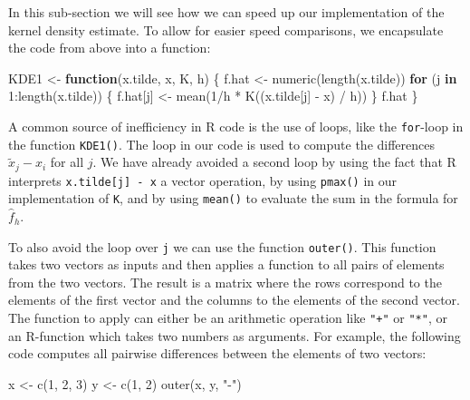 \documentclass[
  a4paper,
]{article}
\newenvironment{Shaded}{\begin{snugshade}}{\end{snugshade}}
\newcommand{\ControlFlowTok}[1]{\textcolor[rgb]{0.13,0.29,0.53}{\textbf{#1}}}
\newcommand{\DecValTok}[1]{\textcolor[rgb]{0.00,0.00,0.81}{#1}}
\newcommand{\FunctionTok}[1]{\textcolor[rgb]{0.00,0.00,0.00}{#1}}
\newcommand{\NormalTok}[1]{#1}
\newcommand{\OtherTok}[1]{\textcolor[rgb]{0.56,0.35,0.01}{#1}}
\newcommand{\SpecialCharTok}[1]{\textcolor[rgb]{0.00,0.00,0.00}{#1}}
\newcommand{\StringTok}[1]{\textcolor[rgb]{0.31,0.60,0.02}{#1}}
\theoremstyle{definition}
\theoremstyle{definition}
\theoremstyle{definition}
\theoremstyle{definition}
\theoremstyle{remark}
\begin{document}
In this sub-section we will see how we can speed up our implementation
of the kernel density estimate.
To allow for easier speed comparisons, we encapsulate the code from
above into a function:

\begin{Shaded}
\begin{Highlighting}[]
\NormalTok{KDE1 }\OtherTok{\textless{}{-}} \ControlFlowTok{function}\NormalTok{(x.tilde, x, K, h) \{}
\NormalTok{  f.hat }\OtherTok{\textless{}{-}} \FunctionTok{numeric}\NormalTok{(}\FunctionTok{length}\NormalTok{(x.tilde))}
  \ControlFlowTok{for}\NormalTok{ (j }\ControlFlowTok{in} \DecValTok{1}\SpecialCharTok{:}\FunctionTok{length}\NormalTok{(x.tilde)) \{}
\NormalTok{    f.hat[j] }\OtherTok{\textless{}{-}} \FunctionTok{mean}\NormalTok{(}\DecValTok{1}\SpecialCharTok{/}\NormalTok{h }\SpecialCharTok{*} \FunctionTok{K}\NormalTok{((x.tilde[j] }\SpecialCharTok{{-}}\NormalTok{ x) }\SpecialCharTok{/}\NormalTok{ h))}
\NormalTok{  \}}
\NormalTok{  f.hat}
\NormalTok{\}}
\end{Highlighting}
\end{Shaded}

A common source of inefficiency in R code is the use of loops, like
the \texttt{for}-loop in the function \texttt{KDE1()}. The loop in our code
is used to compute the differences \(\tilde x_j - x_i\) for all \(j\).
We have already avoided a second loop by using the fact that
R interprets \texttt{x.tilde{[}j{]}\ -\ x} a vector operation, by using \texttt{pmax()}
in our implementation of \texttt{K}, and by using \texttt{mean()} to evaluate
the sum in the formula for~\(\hat f_h\).

To also avoid the loop over \texttt{j} we can use the function \texttt{outer()}. This
function takes two vectors as inputs and then applies a function to all pairs
of elements from the two vectors. The result is a matrix where the rows
correspond to the elements of the first vector and the columns to the elements
of the second vector. The function to apply can either be an arithmetic
operation like \texttt{"+"} or \texttt{"*"}, or an R-function which takes two numbers as
arguments. For example, the following code computes all pairwise differences
between the elements of two vectors:

\begin{Shaded}
\begin{Highlighting}[]
\NormalTok{x }\OtherTok{\textless{}{-}} \FunctionTok{c}\NormalTok{(}\DecValTok{1}\NormalTok{, }\DecValTok{2}\NormalTok{, }\DecValTok{3}\NormalTok{)}
\NormalTok{y }\OtherTok{\textless{}{-}} \FunctionTok{c}\NormalTok{(}\DecValTok{1}\NormalTok{, }\DecValTok{2}\NormalTok{)}
\FunctionTok{outer}\NormalTok{(x, y, }\StringTok{"{-}"}\NormalTok{)}
\end{Highlighting}
\end{Shaded}
\end{document}
